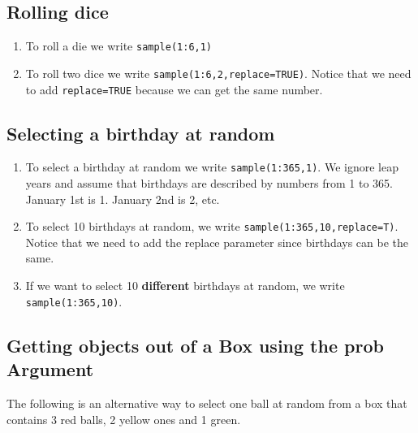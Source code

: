 \documentclass[
]{book}
\providecommand{\tightlist}{%
  \setlength{\itemsep}{0pt}\setlength{\parskip}{0pt}}
\theoremstyle{definition}
\theoremstyle{definition}
\theoremstyle{definition}
\theoremstyle{definition}
\theoremstyle{remark}
\begin{document}
\hypertarget{rolling-dice}{%
\subsection*{Rolling dice}\label{rolling-dice}}

\begin{enumerate}
\def\labelenumi{\arabic{enumi}.}
\tightlist
\item
  To roll a die we write \texttt{sample(1:6,1)}
\item
  To roll two dice we write \texttt{sample(1:6,2,replace=TRUE)}. Notice that we need to add \texttt{replace=TRUE} because we can get the same number.
\end{enumerate}

\hypertarget{selecting-a-birthday-at-random}{%
\subsection*{Selecting a birthday at random}\label{selecting-a-birthday-at-random}}

\begin{enumerate}
\def\labelenumi{\arabic{enumi}.}
\tightlist
\item
  To select a birthday at random we write \texttt{sample(1:365,1)}. We ignore leap years and assume that birthdays are described by numbers from 1 to 365. January 1st is 1. January 2nd is 2, etc.
\item
  To select 10 birthdays at random, we write \texttt{sample(1:365,10,replace=T)}. Notice that we need to add the replace parameter since birthdays can be the same.
\item
  If we want to select 10 \textbf{different} birthdays at random, we write \texttt{sample(1:365,10)}.
\end{enumerate}

\hypertarget{getting-objects-out-of-a-box-using-the-prob-argument}{%
\subsection*{Getting objects out of a Box using the prob Argument}\label{getting-objects-out-of-a-box-using-the-prob-argument}}

The following is an alternative way to select one ball at random from a box that contains 3 red balls, 2 yellow ones and 1 green.
\end{document}
